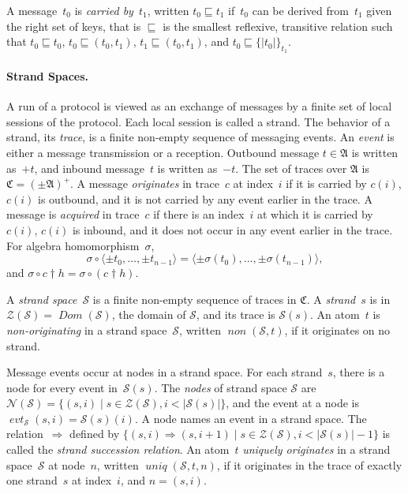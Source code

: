 \documentclass[12pt]{article}
\newcommand{\fn}[1]{\ensuremath{\operatorname{\mathit{#1}}}}
\newcommand{\sdom}{\fn{Dom}}
\newcommand{\seq}[1]{\ensuremath{\langle#1\rangle}}
\newcommand{\prefix}[2]{#1\dagger#2}
\newcommand{\enc}[2]{\ensuremath{\{\!|#1|\!\}_{#2}}}
\newcommand{\inbnd}{\mathord -}
\newcommand{\outbnd}{\mathord +}
\newcommand{\alg}[1]{\ensuremath{\mathfrak{#1}}}
\newcommand{\msg}{\alg{A}}
\newcommand{\ssp}{\ensuremath{\mathcal{S}}}
\newcommand{\strands}{\ensuremath{\mathcal{Z}}}
\newcommand{\nodes}{\ensuremath{\mathcal{N}}}
\newcommand{\tr}{\ensuremath{\mathfrak C}}
\newcommand{\evt}{\fn{evt}}
\begin{document}
A message~$t_0$ is \emph{carried by}~$t_1$, written $t_0\sqsubseteq
t_1$ if~$t_0$ can be derived from~$t_1$ given the right set of keys,
that is $\sqsubseteq$ is the smallest reflexive, transitive relation
such that $t_0\sqsubseteq t_0$, $t_0\sqsubseteq (t_0, t_1)$,
$t_1\sqsubseteq (t_0, t_1)$, and $t_0\sqsubseteq\enc{t_0}{t_1}$.

\paragraph{Strand Spaces.}
A run of a protocol is viewed as an exchange of messages by a finite
set of local sessions of the protocol.  Each local session is called a
strand.  The behavior of a strand, its \emph{trace}, is a finite
non-empty sequence of messaging events.  An \emph{event} is either a
message transmission or a reception.  Outbound message $t\in\msg$ is
written as~$\outbnd t$, and inbound message~$t$ is written as~$\inbnd
t$.  The set of traces over $\msg$ is $\tr=(\pm\msg)^+$.  A message
\emph{originates} in trace~$c$ at index~$i$ if it is carried by
$c(i)$, $c(i)$ is outbound, and it is not carried by any event earlier
in the trace.  A message is \emph{acquired} in trace~$c$ if there is
an index~$i$ at which it is carried by $c(i)$, $c(i)$ is inbound, and
it does not occur in any event earlier in the trace.  For algebra
homomorphism~$\sigma$, \[\sigma\circ\seq{\pm t_0,\ldots,\pm t_{n-1}}=
\seq{\pm \sigma(t_0),\ldots,\pm \sigma(t_{n-1})},\]
and $\sigma\circ\prefix{c}{h}=\sigma\circ(\prefix{c}{h})$.

A \emph{strand space}~{\ssp} is a finite non-empty sequence of traces
in $\tr$.  A \emph{strand}~$s$ is in $\strands(\ssp)=\sdom(\ssp)$, the
domain of $\ssp$, and its trace is $\ssp(s)$.  An atom~$t$ is
\emph{non-originating} in a strand space~$\ssp$, written
$\fn{non}(\ssp,t)$, if it originates on no strand.

Message events occur at nodes in a strand space.  For each strand~$s$,
there is a node for every event in~$\ssp(s)$.  The \emph{nodes} of
strand space $\ssp$ are $\nodes(\ssp)=\{(s,i)\mid s\in\strands(\ssp),
i < |\ssp(s)|\}$, and the event at a node is
$\evt_\ssp(s,i)=\ssp(s)(i)$.  A node names an event in a strand space.
The relation~$\Rightarrow$ defined by $\{(s,i)\Rightarrow(s,i+1)\mid
s\in\strands(\ssp), i<|\ssp(s)|-1\}$ is called the \emph{strand
  succession relation}.  An atom~$t$ \emph{uniquely originates} in a
strand space~$\ssp$ at node~$n$, written $\fn{uniq}(\ssp,t,n)$, if it
originates in the trace of exactly one strand~$s$ at index~$i$, and
$n=(s,i)$.
\end{document}
